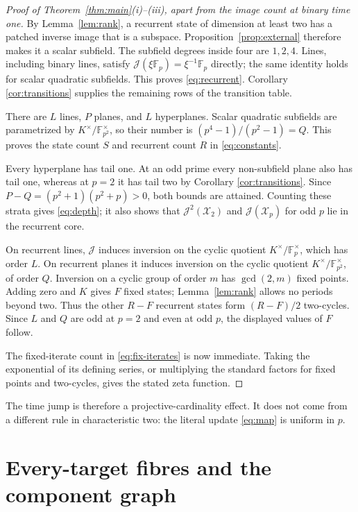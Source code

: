 \documentclass[a4paper,10pt]{amsart}
\theoremstyle{remark}
\newcommand{\F}{\mathbb F}
\newcommand{\K}{K}
\newcommand{\X}{\mathcal X}
\newcommand{\J}{\mathcal J}
\begin{document}
\begin{proof}[Proof of Theorem~\ref{thm:main}(i)--(iii), apart from the
image count at binary time one]
By Lemma~\ref{lem:rank}, a recurrent state of dimension at least two has a
patched inverse image that is a subspace.  Proposition~\ref{prop:external}
therefore makes it a scalar subfield.  The subfield degrees inside four are
$1,2,4$.  Lines, including binary lines, satisfy
$\J(\xi\F_p)=\xi^{-1}\F_p$ directly; the same identity holds for scalar
quadratic subfields.  This proves \eqref{eq:recurrent}.  Corollary
\ref{cor:transitions} supplies the remaining rows of the transition table.

There are $L$ lines, $P$ planes, and $L$ hyperplanes.  Scalar quadratic
subfields are parametrized by
$\K^\times/\F_{p^2}^\times$, so their number is
$(p^4-1)/(p^2-1)=Q$.  This proves the state count $S$ and recurrent count
$R$ in \eqref{eq:constants}.

Every hyperplane has tail one.  At an odd prime every non-subfield plane also
has tail one, whereas at $p=2$ it has tail two by Corollary
\ref{cor:transitions}.  Since
$P-Q=(p^2+1)(p^2+p)>0$, both bounds are attained.  Counting these strata
gives \eqref{eq:depth}; it also shows that $\J^2(\X_2)$ and
$\J(\X_p)$ for odd $p$ lie in the recurrent core.

On recurrent lines, $\J$ induces inversion on the cyclic quotient
$\K^\times/\F_p^\times$, which has order $L$.  On recurrent planes it
induces inversion on the cyclic quotient
$\K^\times/\F_{p^2}^\times$, of order $Q$.  Inversion on a cyclic group of
order $m$ has $\gcd(2,m)$ fixed points.  Adding zero and $\K$ gives $F$ fixed
states; Lemma~\ref{lem:rank} allows no periods beyond two.  Thus the other
$R-F$ recurrent states form $(R-F)/2$ two-cycles.  Since $L$ and $Q$ are odd
at $p=2$ and even at odd $p$, the displayed values of $F$ follow.

The fixed-iterate count in \eqref{eq:fix-iterates} is now immediate.  Taking
the exponential of its defining series, or multiplying the standard factors
for fixed points and two-cycles, gives the stated zeta function.
\end{proof}

The time jump is therefore a projective-cardinality effect.  It does not
come from a different rule in characteristic two: the literal update
\eqref{eq:map} is uniform in $p$.

\section{Every-target fibres and the component graph}
\end{document}
